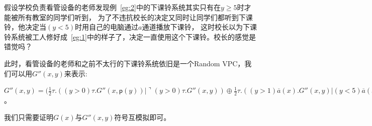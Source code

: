 \begin{example}
   假设学校负责看管设备的老师发现例~\ref{eg:2}中的下课铃系统其实只有在$y\geq 5$时才能被所有教室的同学们听到，
   为了不违抗校长的决定又同时让同学们都听到下课铃，他决定当$(y<5)$时用自己的电脑通过$a$通道播放下课铃，
   这时校长以为下课铃系统被工人修好成~\ref{eg:1}中的样子了，决定一直使用这个下课铃。校长的感觉是错觉吗？

   此时，看管设备的老师和之前不太行的下课铃系统依旧是一个Random VPC，我们可以用$G''(x,y)$来表示:

   $G''(x,y) = (\frac{1}{2}\tau.((y>0)\tau.G''(x,\mathsf{p}(y))|\urcorner (y>0)\tau.G''(x,y))\oplus \frac{1}{2}\tau.((y>1)\overline{a}(x).G''(x,y)|(y<5)\overline{a}(x).G''(x,y))$。

   我们只需要证明$G(x)$与$G''(x,y)$符号互模拟即可。
\end{example}
